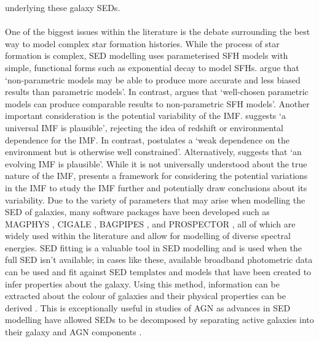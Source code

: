 underlying these galaxy SEDs.\\\\ One of the biggest issues within the literature is the debate surrounding the best way to model complex star formation histories. While the process of star formation is complex, SED modelling uses parameterised SFH models with simple, functional forms such as exponential decay to model SFHs. \cite{leja_how_2019} argue that `non-parametric models may be able to produce more accurate and less biased results than parametric models'. In contrast, \cite{robotham_prospect_2020} argues that `well-chosen parametric models can produce comparable results to non-parametric SFH models'. Another important consideration is the potential variability of the IMF. \cite{kroupa_variation_2001} suggests `a universal IMF is plausible', rejecting the idea of redshift or environmental dependence for the IMF. In contrast, \cite{chabrier_galactic_2003} postulates a `weak dependence on the environment but is otherwise well constrained'. Alternatively, \cite{dokkum_evidence_2008} suggests that `an evolving IMF is plausible'. While it is not universally understood about the true nature of the IMF, \cite{hopkins_dawes_2018} presents a framework for considering the potential variations in the IMF to study the IMF further and potentially draw conclusions about its variability. Due to the variety of parameters that may arise when modelling the SED of galaxies, many software packages have been developed such as MAGPHYS \citep{da_cunha_simple_2008}, CIGALE \citep{boquien_cigale_2019}, BAGPIPES \citep{carnall_inferring_2018}, and PROSPECTOR \citep{leja_deriving_2017, johnson_stellar_2021}, all of which are widely used within the literature and allow for modelling of diverse spectral energies. SED fitting is a valuable tool in SED modelling and is used when the full SED isn't available; in cases like these, available broadband photometric data can be used and fit against SED templates and models that have been created to infer properties about the galaxy. Using this method, information can be extracted about the colour of galaxies and their physical properties can be derived \citep{walcher_fitting_2011}. This is exceptionally useful in studies of AGN as advances in SED modelling have allowed SEDs to be decomposed by separating active galaxies into their galaxy and AGN components \citep{yang_fitting_2022}.  
